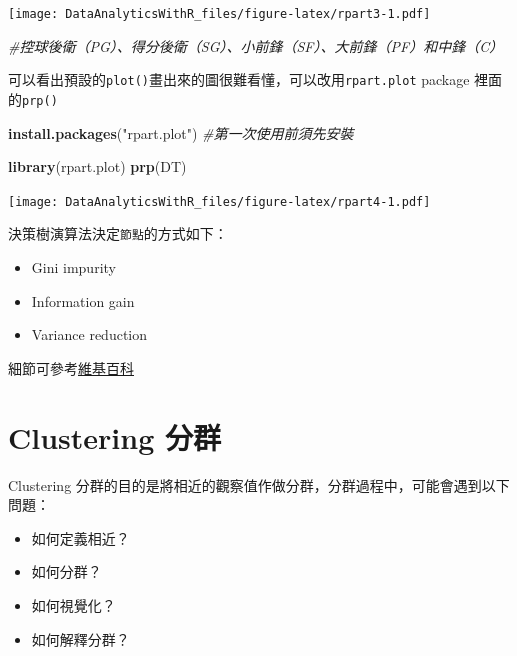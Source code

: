 \documentclass[]{book}
\newenvironment{Shaded}{\begin{snugshade}}{\end{snugshade}}
\newcommand{\CommentTok}[1]{\textcolor[rgb]{0.56,0.35,0.01}{\textit{#1}}}
\newcommand{\KeywordTok}[1]{\textcolor[rgb]{0.13,0.29,0.53}{\textbf{#1}}}
\newcommand{\NormalTok}[1]{#1}
\newcommand{\StringTok}[1]{\textcolor[rgb]{0.31,0.60,0.02}{#1}}
\providecommand{\tightlist}{%
  \setlength{\itemsep}{0pt}\setlength{\parskip}{0pt}}
\begin{document}
\texttt{[image: DataAnalyticsWithR\_files/figure-latex/rpart3-1.pdf]}

\begin{Shaded}
\begin{Highlighting}[]
\CommentTok{#控球後衛（PG）、得分後衛（SG）、小前鋒（SF）、大前鋒（PF）和中鋒（C）}
\end{Highlighting}
\end{Shaded}

可以看出預設的\texttt{plot()}畫出來的圖很難看懂，可以改用\texttt{rpart.plot} package \citep{R-rpart.plot}裡面的\texttt{prp()}

\begin{Shaded}
\begin{Highlighting}[]
\KeywordTok{install.packages}\NormalTok{(}\StringTok{"rpart.plot"}\NormalTok{) }\CommentTok{#第一次使用前須先安裝}
\end{Highlighting}
\end{Shaded}

\begin{Shaded}
\begin{Highlighting}[]
\KeywordTok{library}\NormalTok{(rpart.plot)}
\KeywordTok{prp}\NormalTok{(DT) }
\end{Highlighting}
\end{Shaded}

\texttt{[image: DataAnalyticsWithR\_files/figure-latex/rpart4-1.pdf]}

決策樹演算法決定\texttt{節點}的方式如下：

\begin{itemize}
\tightlist
\item
  Gini impurity
\item
  Information gain
\item
  Variance reduction
\end{itemize}

細節可參考\href{https://en.wikipedia.org/wiki/Decision_tree_learning}{維基百科}

\hypertarget{clustering-ux5206ux7fa4}{%
\section{Clustering 分群}\label{clustering-ux5206ux7fa4}}

Clustering 分群的目的是將相近的觀察值作做分群，分群過程中，可能會遇到以下問題：

\begin{itemize}
\tightlist
\item
  如何定義相近？
\item
  如何分群？
\item
  如何視覺化？
\item
  如何解釋分群？
\end{itemize}
\end{document}
